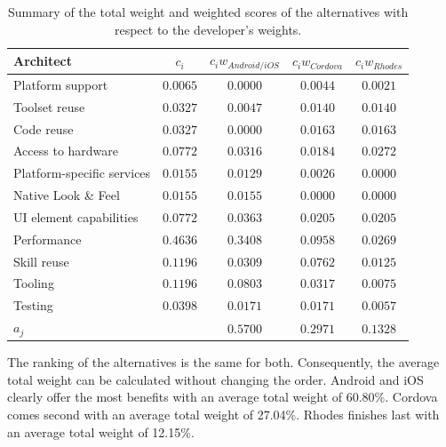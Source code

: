 \begin{table}[h]
    \centering
    \begin{tabular}{lcccc}
        \hline
        \textbf{Architect}         & $c_i$        & $c_i w_{Android/iOS}$ & $c_i w_{Cordova}$  & $c_i w_{Rhodes}$ \\
        \hline
        Platform support           & $0.0065$     & $0.0000$          & $0.0044$       & $0.0021$     \\
        Toolset reuse              & $0.0327$     & $0.0047$          & $0.0140$       & $0.0140$     \\
        Code reuse                 & $0.0327$     & $0.0000$          & $0.0163$       & $0.0163$     \\
        Access to hardware         & $0.0772$     & $0.0316$          & $0.0184$       & $0.0272$     \\
        Platform-specific services & $0.0155$     & $0.0129$          & $0.0026$       & $0.0000$     \\
        Native Look \& Feel        & $0.0155$     & $0.0155$          & $0.0000$       & $0.0000$     \\
        UI element capabilities    & $0.0772$     & $0.0363$          & $0.0205$       & $0.0205$     \\
        Performance                & $0.4636$     & $0.3408$          & $0.0958$       & $0.0269$     \\
        Skill reuse                & $0.1196$     & $0.0309$          & $0.0762$       & $0.0125$     \\
        Tooling                    & $0.1196$     & $0.0803$          & $0.0317$       & $0.0075$     \\
        Testing                    & $0.0398$     & $0.0171$          & $0.0171$       & $0.0057$     \\
        \hline
        $a_j$                      &              & $0.5700$          & $0.2971$       & $0.1328$     \\
        \hline
    \end{tabular}
    \caption{Summary of the total weight and weighted scores of the alternatives with respect to the developer's weights.}
    \label{tab:total:developer}
\end{table}

The ranking of the alternatives is the same for both. Consequently, the average total weight can be calculated without changing the order. Android and iOS clearly offer the most benefits with an average total weight of 60.80\%. Cordova comes second with an average total weight of 27.04\%. Rhodes finishes last with an average total weight of 12.15\%. 

